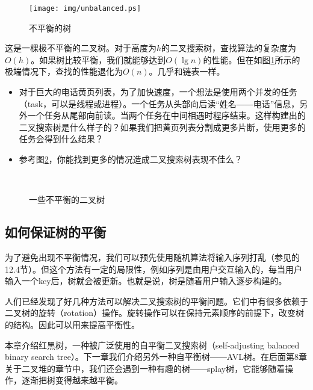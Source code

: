 \documentclass[UTF8]{article}
\begin{document}
\begin{figure}[htbp]
    \centering
	\texttt{[image: img/unbalanced.ps]}
    \caption{不平衡的树} \label{fig:unbalanced-tree}
\end{figure}

这是一棵极不平衡的二叉树。对于高度为$h$的二叉搜索树，查找算法的复杂度为$O(h)$。如果树比较平衡，我们就能够达到$O(\lg n)$的性能。但在如图\ref{fig:unbalanced-tree}所示的极端情况下，查找的性能退化为$O(n)$。几乎和链表一样。

\begin{Exercise}

\begin{itemize}
\item 对于巨大的电话黄页列表，为了加快速度，一个想法是使用两个并发的任务（task，可以是线程或进程）。一个任务从头部向后读“姓名――电话”信息，另外一个任务从尾部向前读。当两个任务在中间相遇时程序结束。这样构建出的二叉搜索树是什么样子的？如果我们把黄页列表分割成更多片断，使用更多的任务会得到什么结果？
\item 参考图\ref{fig:unbalanced-trees}，你能找到更多的情况造成二叉搜索树表现不佳么？
\end{itemize}

\end{Exercise}

\begin{figure}[htbp]
       \centering
        \\
       \caption{一些不平衡的二叉树}
       \label{fig:unbalanced-trees}
\end{figure}

\subsection{如何保证树的平衡}

为了避免出现不平衡情况，我们可以预先使用随机算法将输入序列打乱（参见\cite{CLRS}的12.4节）。但这个方法有一定的局限性，例如序列是由用户交互输入的，每当用户输入一个key后，树就会被更新。也就是说，树是随着用户输入逐步构建的。

人们已经发现了好几种方法可以解决二叉搜索树的平衡问题。它们中有很多依赖于二叉树的旋转（rotation）操作。旋转操作可以在保持元素顺序的前提下，改变树的结构。因此可以用来提高平衡性。

本章介绍红黑树，一种被广泛使用的自平衡二叉搜索树（self-adjusting balanced binary search tree）。下一章我们介绍另外一种自平衡树――AVL树。在后面第8章关于二叉堆的章节中，我们还会遇到一种有趣的树――splay树，它能够随着操作，逐渐把树变得越来越平衡。
\end{document}
